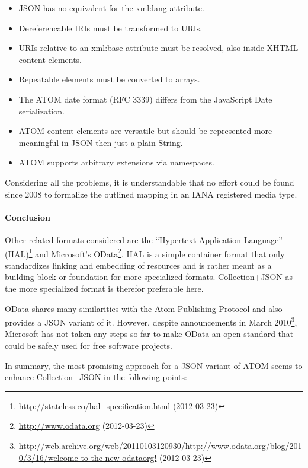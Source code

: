 \documentclass[11pt,a4paper,headsepline,twoside]{scrartcl}		%
\newcommand{\citeurl}[2]{\url{#1} (#2)}
\begin{document}
\begin{itemize}
  \item JSON has no equivalent for the xml:lang attribute.
  \item Dereferencable IRIs must be transformed to URIs.
  \item URIs relative to an xml:base attribute must be resolved, also inside XHTML content elements.
  \item Repeatable elements must be converted to arrays.
  \item The ATOM date format (RFC 3339) differs from the JavaScript Date serialization.
  \item ATOM content elements are versatile but should be represented more meaningful in JSON then just a plain String.
  \item ATOM supports arbitrary extensions via namespaces.
\end{itemize}

Considering all the problems, it is understandable that no effort could be found
since 2008 to formalize the outlined mapping in an IANA registered media type.

\paragraph{Conclusion}

Other related formats considered are the ``Hypertext Application Language''
(HAL)\footnote{\citeurl{http://stateless.co/hal_specification.html}{2012-03-23}}
and Microsoft's OData\footnote{\citeurl{http://www.odata.org}{2012-03-23}}. HAL
is a simple container format that only standardizes linking and embedding of
resources and is rather meant as a building block or foundation for more
specialized formats. Collection+JSON as the more specialized format is therefor
preferable here.

OData shares many similarities with the Atom Publishing Protocol and also
provides a JSON variant of it. However, despite announcements in March
2010\footnote{\citeurl{http://web.archive.org/web/20110103120930/http://www.odata.org/blog/2010/3/16/welcome-to-the-new-odataorg!}{2012-03-23}},
Microsoft has not taken any steps so far to make OData an open standard that
could be safely used for free software projects.

In summary, the most promising approach for a JSON variant of ATOM seems to
enhance Collection+JSON in the following points:
\end{document}
